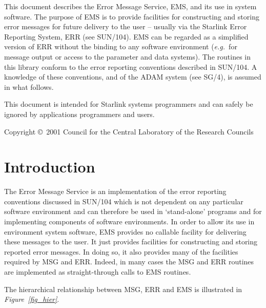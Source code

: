 \documentclass[twoside,11pt]{article}
\newcommand{\stardocinitials}  {SUN}
\newcommand{\stardoccopyright} 
{Copyright \copyright\ 2001 Council for the Central Laboratory of the Research
Councils}
\newcommand{\stardocnumber}    {4.13}
\newcommand{\stardocabstract}  {This document describes the Error Message
Service, EMS, and its use in system software.
The purpose of EMS is to provide facilities for constructing and storing
error messages for future delivery to the user -- usually via the Starlink
Error Reporting System, ERR (see
\xref{SUN/104}{sun104}{err_error_reporting_system}).
EMS can be regarded as a simplified version of ERR without the binding to
any software environment (\textit{e.g.}\ for message output or access to the
parameter and data systems).
The routines in this library conform to the error reporting conventions
described in SUN/104.
A knowledge of these conventions, and of the ADAM system
(see \xref{SG/4}{sg4}{}), is assumed in what follows.

This document is intended for Starlink systems programmers and can safely be
ignored by applications programmers and users.}
\newcommand{\stardocname}{\stardocinitials /\stardocnumber}
\newenvironment{latexonly}{}{}
\newcommand{\xref}[3]{#1}
\newcommand{\xlabel}[1]{}
\renewcommand{\_}{\texttt{\symbol{95}}}
\renewcommand{\thepage}{\roman{page}}
\begin{document}
\stardocabstract

\begin{latexonly}
\newpage
\vspace*{\fill}
\stardoccopyright
\end{latexonly}

  \newpage
  \begin{latexonly}
    \setlength{\parskip}{0mm}
    \tableofcontents
    \setlength{\parskip}{\medskipamount}
    \markboth{\stardocname}{\stardocname}
  \end{latexonly}

\cleardoublepage
\renewcommand{\thepage}{\arabic{page}}
\setcounter{page}{1}


\section{\xlabel{introduction}Introduction}

The Error Message Service is an implementation of the error reporting 
conventions discussed in 
\xref{SUN/104}{sun104}{err_error_reporting_system} 
which is not dependent on any particular software environment and can
therefore be used in `stand-alone' programs and for implementing components of
software environments.
In order to allow its use in environment system software, EMS provides
no callable facility for delivering these messages to the user.
It just provides facilities for constructing and storing reported error
messages.
In doing so, it also provides many of the facilities required by 
\xref{MSG and ERR}{sun104}{}. Indeed, in many cases the MSG and ERR routines
are implemented as straight-through calls to EMS routines.


The hierarchical relationship between MSG, ERR and EMS is illustrated in 
\textit{Figure~\ref{fig_hier}}.
\end{document}
